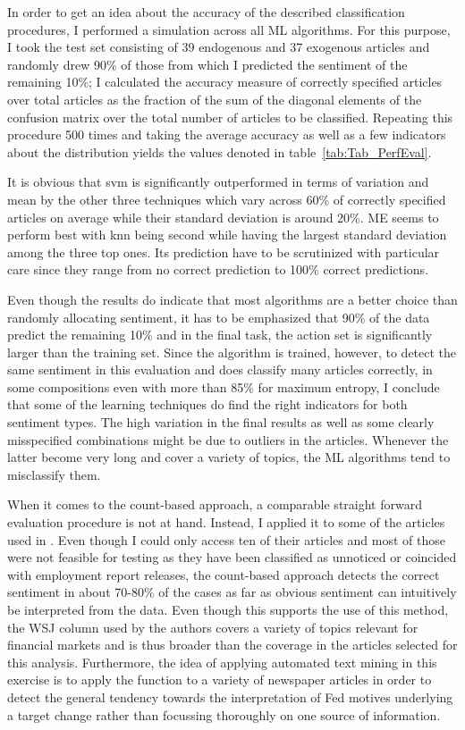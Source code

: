 In order to get an idea about the accuracy of the described classification procedures, I performed a simulation across all ML algorithms. For this purpose, I took the test set consisting of 39 endogenous and 37 exogenous articles and randomly drew 90\% of those from which I predicted the sentiment of the remaining 10\%; I calculated the accuracy measure of correctly specified articles over total articles as the fraction of the sum of the diagonal elements of the confusion matrix over the total number of articles to be classified. Repeating this procedure 500 times and taking the average accuracy as well as a few indicators about the distribution yields the values denoted in table~\vref{tab:Tab_PerfEval}.

%
It is obvious that svm is significantly outperformed in terms of variation and mean by the other three techniques which vary across 60\% of correctly specified articles on average while their standard deviation is around 20\%. ME seems to perform best with knn being second while having the largest standard deviation among the three top ones. Its prediction have to be scrutinized with particular care since they range from no correct prediction to 100\% correct predictions.

Even though the results do indicate that most algorithms are a better choice than randomly allocating sentiment, it has to be emphasized that 90\% of the data predict the remaining 10\% and in the final task, the action set is significantly larger than the training set. Since the algorithm is trained, however, to detect the same sentiment in this evaluation and does classify many articles correctly, in some compositions even with more than 85\% for maximum entropy, I conclude that some of the learning techniques do find the right indicators for both sentiment types. The high variation in the final results as well as some clearly misspecified combinations might be due to outliers in the articles. Whenever the latter become very long and cover a variety of topics, the ML algorithms tend to misclassify them. 

When it comes to the count-based approach, a comparable straight forward evaluation procedure is not at hand. Instead, I applied it to some of the articles used in \textcite{Ellingsen.2003}. Even though I could only access ten of their articles and most of those were not feasible for testing as they have been classified as unnoticed or coincided with employment report releases, the count-based approach detects the correct sentiment in about 70-80\% of the cases as far as obvious sentiment can intuitively be interpreted from the data. Even though this supports the use of this method, the WSJ column used by the authors covers a variety of topics relevant for financial markets and is thus broader than the coverage in the articles selected for this analysis. Furthermore, the idea of applying automated text mining in this exercise is to apply the function to a variety of newspaper articles in order to detect the general tendency towards the interpretation of Fed motives underlying a target change rather than focussing thoroughly on one source of information.
%